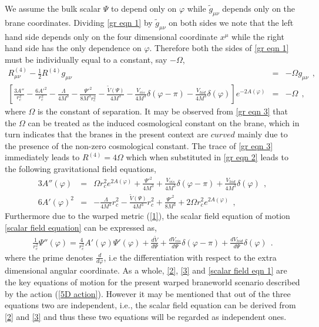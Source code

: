 \documentclass{article}
\begin{document}
We assume the bulk scalar $\Psi$ to depend only on $\varphi$ while $\tilde{g}_{\mu\nu}$ depends only on the brane coordinates. Dividing \ref{gr eqn 1} by $\tilde{g}_{\mu\nu}$ on both sides we note that the left hand side depends only on the four dimensional coordinate $x^{\mu}$ while the right hand 
side has the only dependence on $\varphi$. Therefore both the sides of \ref{gr eqn 1} must be individually equal to a constant, say $-\Omega$, 
\begin{eqnarray}
 R_{\mu\nu}^{(4)} - \frac{1}{2}R^{(4)}g_{\mu\nu}&=&-\Omega g_{\mu\nu}~~,\label{gr eqn 3}\\
 \left[\frac{3A''}{r_c^2} - \frac{6A'^2}{r_c^2} - \frac{\Lambda}{4M^3} 
 - \frac{\Psi'^2}{8M^3r_c^2} - \frac{\tilde{V}(\Psi)}{4M^3} - \frac{V_{vis}}{4M^3} \delta(\varphi-\pi) - \frac{V_{hid}}{4M^3} \delta(\varphi) \right]e^{-2A(\varphi)}&=&-\Omega~~,
 \label{gr eqn 4}
\end{eqnarray}
where $\Omega$ is the constant of separation. It may be observed from \ref{gr eqn 3} that the $\Omega$ can be treated as 
the induced cosmological constant on the brane, which in turn indicates that the branes in the present context are $curved$ mainly due to the presence 
of the non-zero cosmological constant. The trace of \ref{gr eqn 3} immediately leads to $R^{(4)} = 4\Omega$ which when substituted in \ref{gr eqn 2} leads to the following gravitational field
equations,
\begin{eqnarray}
 3A''(\varphi)&=&\Omega r_c^2e^{2A(\varphi)} + \frac{\Psi'^2}{4M^3} + \frac{V_{vis}}{4M^3} \delta(\varphi-\pi) + \frac{V_{hid}}{4M^3} \delta(\varphi)~~,\label{2}\\
  6A'(\varphi)^2&=&-\frac{\Lambda}{4M^3}r_c^2 - \frac{\tilde{V}(\Psi)}{4M^3}r_c^2 + \frac{\Psi'^2}{8M^3}  + 
  2 \Omega r_c^2e^{2A(\varphi)}~~,
 \label{3}
\end{eqnarray}
Furthermore due to the warped metric (\ref{1}), the scalar field equation of motion \ref{scalar field equation} can be expressed as,
\begin{eqnarray}
 \frac{1}{r_c^2}\Psi''(\varphi) = \frac{4}{r_c^2}A'(\varphi)\Psi'(\varphi) + \frac{d\tilde{V}}{d\Psi} + \frac{dV_{vis}}{d\Psi} \delta(\varphi-\pi) + \frac{dV_{hid}}{d\Psi} \delta(\varphi) ~~.
 \label{scalar field eqn 1}
\end{eqnarray}
where the prime denotes $\frac{d}{d\varphi}$, i.e the differentiation with respect to the extra dimensional angular coordinate. 
As a whole, \ref{2}, \ref{3} and \ref{scalar field eqn 1} are the key equations of motion for the present warped braneworld scenario 
described by the action (\ref{5D action}). However it may be mentioned that out of the three equations two are independent, i.e.,
the scalar field equation can be derived from \ref{2} and \ref{3} and thus these two equations will be regarded as independent ones. 
\end{document}
